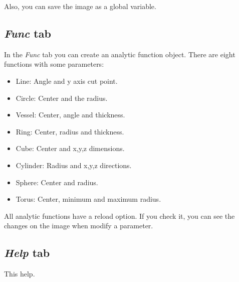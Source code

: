 \documentclass{article}
\begin{document}
Also, you can save the image as a global variable.

\subsection{\emph{Func} tab}
In the \emph{Func} tab you can create an analytic function object. There are eight functions with some parameters:
\begin{itemize}
	\item Line: Angle and y axis cut point.
	\item Circle: Center and the radius.
	\item Vessel: Center, angle and thickness.
	\item Ring: Center, radius and thickness.
	\item Cube: Center and x,y,z dimensions.
	\item Cylinder: Radius and x,y,z directions.
	\item Sphere: Center and radius.
	\item Torus: Center, minimum and maximum radius.
\end{itemize}

All analytic functions have a reload option. If you check it, you can see the changes on the image when modify a parameter.

\subsection{\emph{Help} tab}
This help.
\end{document}
